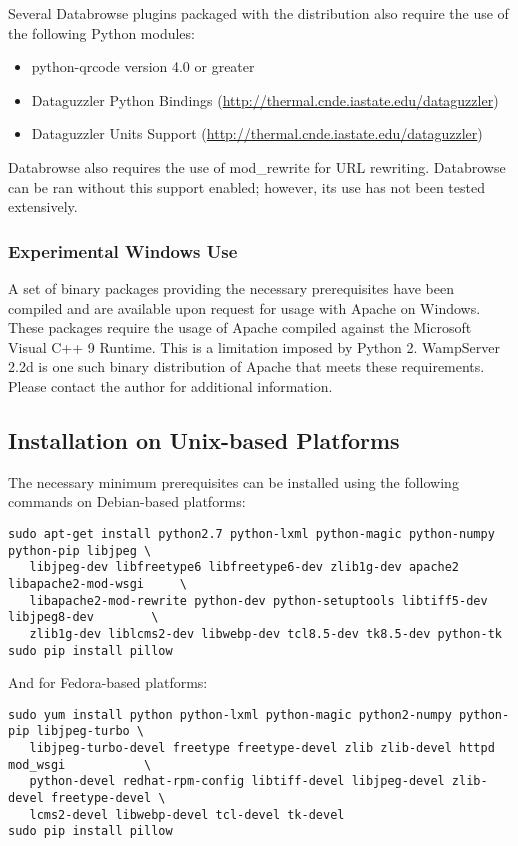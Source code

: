 \documentclass[10pt]{article}
\begin{document}
Several Databrowse plugins packaged with the distribution also require the use of the following Python modules:

\begin{itemize}
	\item python-qrcode version 4.0 or greater
	\item Dataguzzler Python Bindings (\url{http://thermal.cnde.iastate.edu/dataguzzler})
	\item Dataguzzler Units Support (\url{http://thermal.cnde.iastate.edu/dataguzzler})
\end{itemize}

Databrowse also requires the use of mod\_rewrite for URL rewriting.  Databrowse can be ran without this support enabled; however, its use has not been tested extensively.

\subsubsection{Experimental Windows Use}

A set of binary packages providing the necessary prerequisites have been compiled and are available upon request for usage with Apache on Windows.  These packages require the usage of Apache compiled against the Microsoft Visual C++ 9 Runtime.  This is a limitation imposed by Python 2.  WampServer 2.2d is one such binary distribution of Apache that meets these requirements.  Please contact the author for additional information. 

\subsection{Installation on Unix-based Platforms}

The necessary minimum prerequisites can be installed using the following commands on Debian-based platforms:

\begin{verbatim}
sudo apt-get install python2.7 python-lxml python-magic python-numpy python-pip libjpeg \
   libjpeg-dev libfreetype6 libfreetype6-dev zlib1g-dev apache2 libapache2-mod-wsgi     \
   libapache2-mod-rewrite python-dev python-setuptools libtiff5-dev libjpeg8-dev        \
   zlib1g-dev liblcms2-dev libwebp-dev tcl8.5-dev tk8.5-dev python-tk
sudo pip install pillow
\end{verbatim}

And for Fedora-based platforms:

\begin{verbatim}
sudo yum install python python-lxml python-magic python2-numpy python-pip libjpeg-turbo \
   libjpeg-turbo-devel freetype freetype-devel zlib zlib-devel httpd mod_wsgi           \
   python-devel redhat-rpm-config libtiff-devel libjpeg-devel zlib-devel freetype-devel \
   lcms2-devel libwebp-devel tcl-devel tk-devel
sudo pip install pillow
\end{verbatim}
\end{document}
